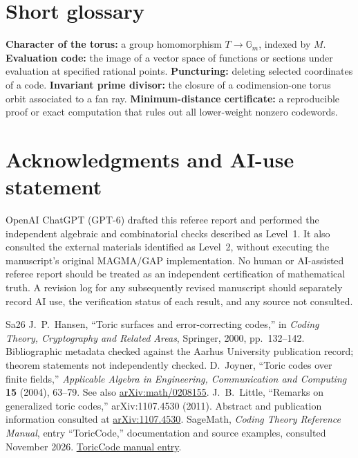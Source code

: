 \documentclass[12pt,letterpaper]{article}
\begin{document}
\section*{Short glossary}
\textbf{Character of the torus:} a group homomorphism $T\to\mathbb G_m$, indexed by $M$.  \textbf{Evaluation code:} the image of a vector space of functions or sections under evaluation at specified rational points.  \textbf{Puncturing:} deleting selected coordinates of a code.  \textbf{Invariant prime divisor:} the closure of a codimension-one torus orbit associated to a fan ray.  \textbf{Minimum-distance certificate:} a reproducible proof or exact computation that rules out all lower-weight nonzero codewords.

\section*{Acknowledgments and AI-use statement}
OpenAI ChatGPT (GPT-6) drafted this referee report and performed the independent algebraic and combinatorial checks described as Level~1.  It also consulted the external materials identified as Level~2, without executing the manuscript's original MAGMA/GAP implementation.  No human or AI-assisted referee report should be treated as an independent certification of mathematical truth.  A revision log for any subsequently revised manuscript should separately record AI use, the verification status of each result, and any source not consulted.

\begingroup
\setlength{\parskip}{0pt}
\begin{thebibliography}{Sa26}
\setlength{\itemsep}{1pt}
J.~P.~Hansen, ``Toric surfaces and error-correcting codes,'' in \emph{Coding Theory, Cryptography and Related Areas}, Springer, 2000, pp.~132--142.  Bibliographic metadata checked against the Aarhus University publication record; theorem statements not independently checked.
D.~Joyner, ``Toric codes over finite fields,'' \emph{Applicable Algebra in Engineering, Communication and Computing} \textbf{15} (2004), 63--79.  See also \href{https://arxiv.org/abs/math/0208155}{arXiv:math/0208155}.
J.~B.~Little, ``Remarks on generalized toric codes,'' arXiv:1107.4530 (2011).  Abstract and publication information consulted at \href{https://arxiv.org/abs/1107.4530}{arXiv:1107.4530}.
SageMath, \emph{Coding Theory Reference Manual}, entry ``ToricCode,'' documentation and source examples, consulted November 2026.  \href{https://doc-gitlab.sagemath.org/html/en/reference/coding/sage/coding/code_constructions.html}{ToricCode manual entry}.
\end{thebibliography}
\endgroup
\end{document}
